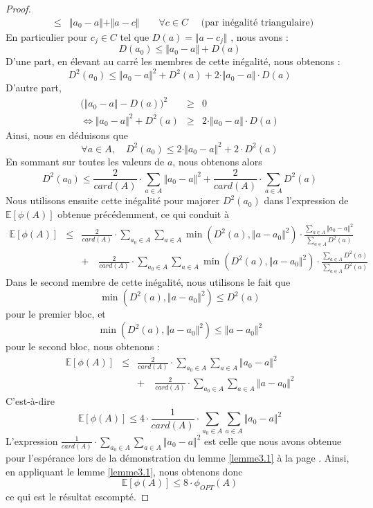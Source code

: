 \documentclass[12pt,a4paper]{book}
\newcommand{\E}{\mathbb{E}}
\newcommand{\1}{\mathds{1}}
\begin{document}
\begin{proof}
\begin{eqnarray*}
			& \leq & \Vert a_0 - a \Vert + \Vert a - c \Vert \qquad \forall c \in C \quad \textrm{ (par inégalité triangulaire)}
		\end{eqnarray*}
		En particulier pour $c_j \in C$ tel que $D(a) = \Vert a - c_j \Vert$ , nous avons :
		$$
			D(a_0) \leq \Vert a_0 - a \Vert + D(a)
		$$
		D'une part, en élevant au carré les membres de cette inégalité, nous obtenons :
		$$
			D^2(a_0) \leq \Vert a_0 - a \Vert^2 + D^2(a) + 2 \cdot \Vert a_0 - a \Vert \cdot D(a)
		$$
		D'autre part,
		\begin{eqnarray*}
			\bigg( \Vert a_0 - a \Vert - D(a)\bigg)^2 & \geq & 0 \\
			\Leftrightarrow \Vert a_0 - a \Vert^2 + D^2(a) & \geq & 2 \cdot \Vert a_0 - a \Vert \cdot D(a)
		\end{eqnarray*}
		Ainsi, nous en déduisons  que
		$$
			\forall a \in A, \quad D^2(a_0) \leq 2 \cdot \Vert a_0 - a \Vert^2 + 2 \cdot D^2(a)
		$$
		En sommant sur toutes les valeurs de $a$, nous obtenons alors 
		$$
			D^2(a_0) \leq \frac{2}{card(A)} \cdot \sum_{a \in A} \Vert a_0 - a \Vert^2 + \frac{2}{card(A)} \cdot \sum_{a \in A} D^2(a)
		$$
		Nous utilisons ensuite cette inégalité pour majorer $D^2(a_0)$ dans l'expression de $\E\left[\phi(A)\right]$ obtenue précédemment, ce qui conduit à 
		\begin{eqnarray*}
			\E\left[\phi(A)\right] & \leq & \frac{2}{card(A)} \cdot \sum_{a_0 \in A} \sum_{a \in A} \min \left( D^2(a), \Vert a-a_0 \Vert^2 \right) \cdot \frac{\sum_{a \in A} \Vert a_0 - a \Vert^2}{ \sum_{a \in A} D^2(a)} \\
			&& + \quad \frac{2}{card(A)} \cdot \sum_{a_0 \in A} \sum_{a \in A} \min \left( D^2(a), \Vert a-a_0 \Vert^2 \right) \cdot \frac{\sum_{a \in A} D^2(a)}{ \sum_{a \in A} D^2(a)} 
		\end{eqnarray*}
		Dans le second membre de cette inégalité, nous utilisons le fait que 
		$$
			\min \left( D^2(a), \Vert a-a_0 \Vert^2 \right) \leq D^2(a)
		$$
		pour le premier bloc, et 
		$$
			\min \left( D^2(a), \Vert a-a_0 \Vert^2 \right) \leq \Vert a-a_0 \Vert^2
		$$
		pour le second bloc, nous obtenons :
		\begin{eqnarray*}
			\E\left[\phi(A)\right] & \leq & \frac{2}{card(A)} \cdot \sum_{a_0 \in A} \sum_{a \in A} \Vert a_0 - a \Vert^2 \\
			&& + \quad \frac{2}{card(A)} \cdot \sum_{a_0 \in A} \sum_{a \in A} \Vert a-a_0 \Vert^2
		\end{eqnarray*}
		C'est-à-dire 
		$$
			\E\left[\phi(A)\right] \leq 4 \cdot \frac{1}{card(A)} \cdot \sum_{a_0 \in A} \sum_{a \in A} \Vert a_0 - a \Vert^2
		$$
		L'expression $\frac{1}{card(A)} \cdot \sum_{a_0 \in A} \sum_{a \in A} \Vert a_0 - a \Vert^2$ est celle que nous avons obtenue pour l'espérance lors de la démonstration du lemme \ref{lemme3.1} à la page \pageref{lemme3.1}. Ainsi, en appliquant le lemme \ref{lemme3.1}, nous obtenons donc
		$$
			\E\left[\phi(A)\right] \leq 8 \cdot \phi_{OPT} \left( A \right)
		$$
		ce qui est le résultat escompté.
	\end{proof}
	
\end{document}
